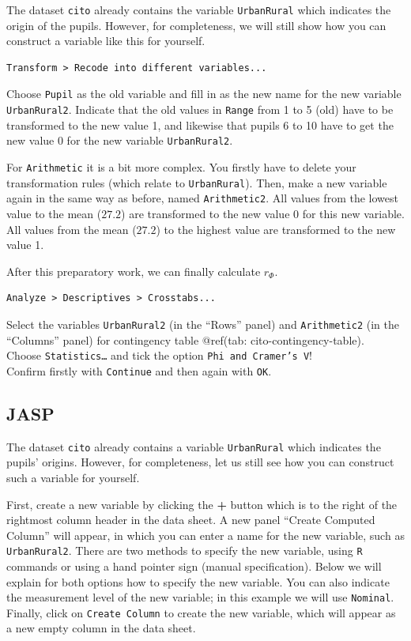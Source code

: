 \documentclass[
]{book}
\begin{document}
The dataset \texttt{cito} already contains the variable \texttt{UrbanRural} which indicates the
origin of the pupils. However, for completeness, we will still show how you can
construct a variable like this for yourself.

\begin{verbatim}
Transform > Recode into different variables...
\end{verbatim}

Choose \texttt{Pupil} as the old variable and fill in as the new name for the new variable
\texttt{UrbanRural2}. Indicate that the old values in \texttt{Range} from
1 to 5 (old) have to be transformed to the new value 1, and likewise that
pupils 6 to 10 have to get the new value 0 for the new variable
\texttt{UrbanRural2}.

For \texttt{Arithmetic} it is a bit more complex. You firstly have to delete
your transformation rules (which relate to \texttt{UrbanRural}). Then, make a new variable
again in the same way as before, named \texttt{Arithmetic2}.
All values from the lowest value to the mean (\(27.2\)) are transformed to the
new value 0 for this new variable. All values
from the mean (\(27.2\)) to the highest value are transformed to the new value 1.

After this preparatory work, we can finally calculate \(r_\Phi\).

\begin{verbatim}
Analyze > Descriptives > Crosstabs...
\end{verbatim}

Select the variables \texttt{UrbanRural2} (in the ``Rows'' panel) and \texttt{Arithmetic2}
(in the ``Columns'' panel) for
contingency table @ref(tab: cito-contingency-table).\\
Choose \texttt{Statistics\ldots{}} and tick the option \texttt{Phi\ and\ Cramer’s\ V}!\\
Confirm firstly with \texttt{Continue} and then again with \texttt{OK}.

\hypertarget{jasp-9}{%
\subsection{JASP}\label{jasp-9}}

The dataset \texttt{cito} already contains a variable \texttt{UrbanRural} which indicates the pupils' origins.
However, for completeness, let us still see how you can construct such a variable for yourself.

First, create a new variable by clicking the \textbf{+} button which is to the right of the rightmost column header in the data sheet. A new panel ``Create Computed Column'' will appear, in which you can enter a name for the new variable, such as \texttt{UrbanRural2}.
There are two methods to specify the new variable, using \texttt{R} commands or using a hand pointer sign (manual specification). Below we will explain for both options how to specify the new variable. You can also indicate the measurement level of the new variable; in this example we will use \texttt{Nominal}. Finally, click on \texttt{Create\ Column} to create the new variable, which will appear as a new empty column in the data sheet.
\end{document}
